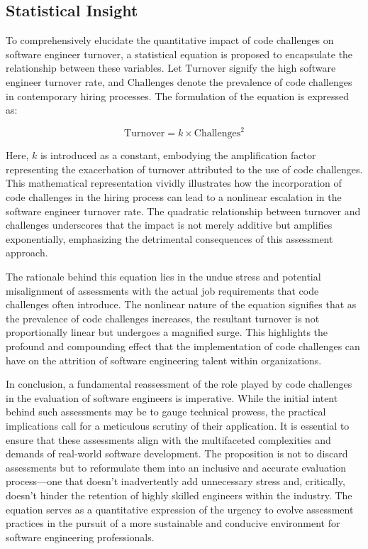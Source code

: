 \documentclass[
    a4paper, %
    10pt, %
    unnumberedsections, %
    twoside, %
]{LTJournalArticle}
\begin{document}
\subsection{Statistical Insight}

To comprehensively elucidate the quantitative impact of code challenges on software engineer turnover, a statistical equation is proposed to encapsulate the relationship between these variables. Let $\text{Turnover}$ signify the high software engineer turnover rate, and $\text{Challenges}$ denote the prevalence of code challenges in contemporary hiring processes. The formulation of the equation is expressed as:

\begin{equation}
	\text{Turnover} = k \times \text{Challenges}^2
\end{equation}

Here, $k$ is introduced as a constant, embodying the amplification factor representing the exacerbation of turnover attributed to the use of code challenges. This mathematical representation vividly illustrates how the incorporation of code challenges in the hiring process can lead to a nonlinear escalation in the software engineer turnover rate. The quadratic relationship between turnover and challenges underscores that the impact is not merely additive but amplifies exponentially, emphasizing the detrimental consequences of this assessment approach.

The rationale behind this equation lies in the undue stress and potential misalignment of assessments with the actual job requirements that code challenges often introduce. The nonlinear nature of the equation signifies that as the prevalence of code challenges increases, the resultant turnover is not proportionally linear but undergoes a magnified surge. This highlights the profound and compounding effect that the implementation of code challenges can have on the attrition of software engineering talent within organizations.

In conclusion, a fundamental reassessment of the role played by code challenges in the evaluation of software engineers is imperative. While the initial intent behind such assessments may be to gauge technical prowess, the practical implications call for a meticulous scrutiny of their application. It is essential to ensure that these assessments align with the multifaceted complexities and demands of real-world software development. The proposition is not to discard assessments but to reformulate them into an inclusive and accurate evaluation process—one that doesn't inadvertently add unnecessary stress and, critically, doesn't hinder the retention of highly skilled engineers within the industry. The equation serves as a quantitative expression of the urgency to evolve assessment practices in the pursuit of a more sustainable and conducive environment for software engineering professionals.
\end{document}
